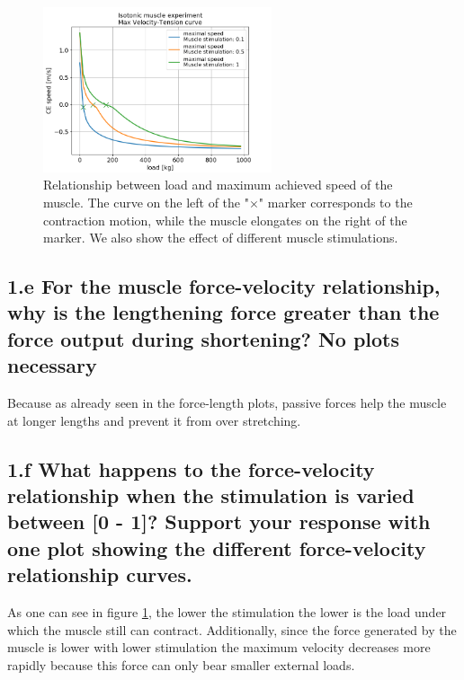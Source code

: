 \documentclass{cmc}
\begin{document}
\begin{figure}[ht]
    \centering
    \includegraphics[width=0.6\textwidth]{figures/Max_Velocity-Tension_curve.png}
    \caption{Relationship between load and maximum achieved speed of the muscle. The curve on the left of the "$\times$" marker corresponds to the contraction motion, while the muscle elongates on the right of the marker. We also show the effect of different muscle stimulations.}
    \label{fig:maxVel}
\end{figure}

\subsection*{1.e For the muscle force-velocity relationship, why is
  the lengthening force greater than the force output during
  shortening? No plots necessary}

Because as already seen in the force-length plots, passive forces help the muscle at longer lengths and prevent it from over stretching.

\subsection*{1.f What happens to the force-velocity relationship
  when the stimulation is varied between [0 - 1]? Support your
  response with one plot showing the different force-velocity
  relationship curves.  }

As one can see in figure \ref{fig:maxVel}, the lower the stimulation the lower is the load under which the muscle still can contract. Additionally, since the force generated by the muscle is lower with lower stimulation the maximum velocity decreases more rapidly because this force can only bear smaller external loads.
\end{document}
